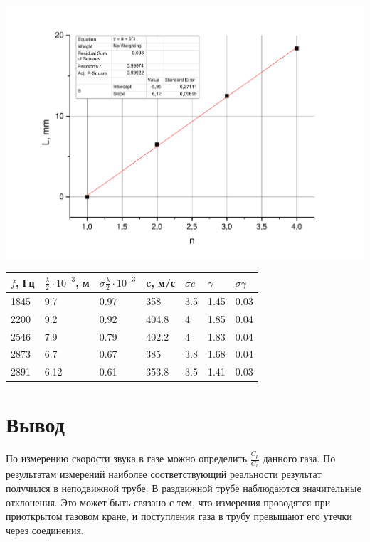 \documentclass[a4paper,12pt]{article}
\begin{document}
	\includegraphics[width = 0.8\linewidth]{Graph5air}
		
		\begin{center}
			\begin{tabular}{l | l | l | l | l | l | l}
				$f$, Гц & $\frac{\lambda}{2}\cdot 10^{-3}$, м & $\sigma\frac{\lambda}{2}\cdot 10^{-3}$ & c, м/с &$\sigma c$ & $\gamma$ & $\sigma\gamma$\\ \hline
				1845 & 9.7 & 0.97 & 358 & 3.5 & 1.45 & 0.03 \\ \hline
				2200 & 9.2 & 0.92 & 404.8 & 4 & 1.85 & 0.04 \\ \hline
				2546 & 7.9 & 0.79 & 402.2 & 4 & 1.83 & 0.04\\ \hline
				2873 & 6.7 & 0.67 & 385 & 3.8 & 1.68 &  0.04 \\ \hline
				2891 & 6.12 & 0.61 & 353.8 & 3.5 & 1.41 &  0.03 \\ \hline
			\end{tabular}
		\end{center}	
	\section{Вывод}
		По измерению скорости звука в газе можно определить $\frac{C_p}{C_v}$ данного газа. По результатам измерений наиболее соответствующий реальности результат получился в неподвижной трубе. В раздвижной трубе наблюдаются значительные отклонения. Это может быть связано с тем, что измерения проводятся при приоткрытом газовом кране, и поступления газа в трубу превышают его утечки через соединения.
		
\end{document}
